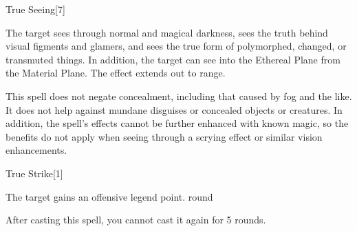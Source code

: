\begin{spellsection}{True Seeing}[7]
    \begin{spellheader}
    \end{spellheader}
    \begin{spellcontent}
        \begin{spelltargetinginfo}
        \end{spelltargetinginfo}
        \begin{spelleffects}
            \spelleffect The target sees through normal and magical darkness, sees the truth behind visual figments and glamers, and sees the true form of polymorphed, changed, or transmuted things. In addition, the target can see into the Ethereal Plane from the Material Plane. The effect extends out to \rngmed range.
            \spelldur \durshort
        \end{spelleffects}
    \end{spellcontent}
    \begin{spellfooter}
        \spellnotes This spell does not negate concealment, including that caused by fog and the like. It does not help against mundane disguises or concealed objects or creatures. In addition, the spell's effects cannot be further enhanced with known magic, so the benefits do not apply when seeing through a scrying effect or similar vision enhancements.
        \miscastexplode
    \end{spellfooter}
\end{spellsection}

\begin{spellsection}{True Strike}[1]
    \begin{spellheader}
    \end{spellheader}
    \begin{spellcontent}
        \begin{spelltargetinginfo}
        \end{spelltargetinginfo}
        \begin{spelleffects}
            \spelleffect The target gains an offensive legend point.
             round
        \end{spelleffects}
    \end{spellcontent}
    \begin{spellfooter}
        \spellnotes After casting this spell, you cannot cast it again for 5 rounds.
        \miscastrandom
    \end{spellfooter}
\end{spellsection}

